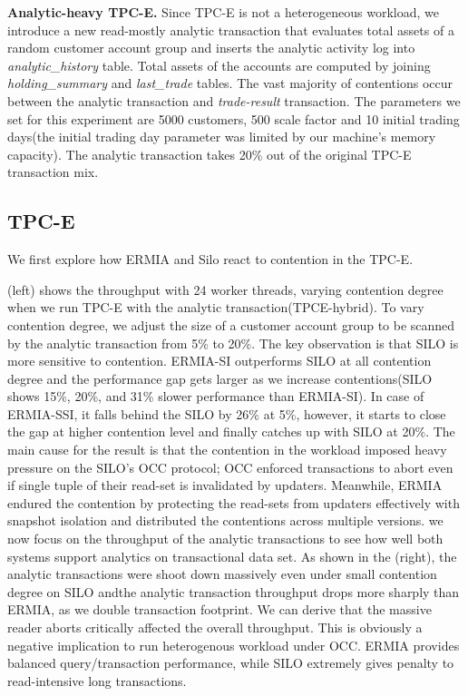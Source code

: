 \textbf{Analytic-heavy TPC-E.}
Since TPC-E is not a heterogeneous workload, we introduce a new read-mostly analytic transaction that evaluates total assets of a random customer account group and inserts the analytic activity log into \textit{analytic\_history} table. Total assets of the accounts are computed by joining \textit{holding\_summary} and \textit{last\_trade} tables. The vast majority of contentions occur between the analytic transaction and \textit{trade-result} transaction.
The parameters we set for this experiment are 5000 customers, 500 scale factor and 10 initial trading days(the initial trading day parameter was limited by our machine's memory capacity).
The analytic transaction takes 20\% out of the original TPC-E transaction mix. %

\subsection{TPC-E}
We first explore how ERMIA and Silo react to contention in the TPC-E.


(left) shows the throughput with 24 worker threads, varying contention degree when we run TPC-E with the analytic transaction(TPCE-hybrid). To vary contention degree, we adjust the size of a customer account group to be scanned by the analytic transaction from 5\% to 20\%. The key observation is that SILO is more sensitive to contention. ERMIA-SI outperforms SILO at all contention degree and the performance gap gets larger as we increase contentions(SILO shows 15\%, 20\%, and 31\% slower performance than ERMIA-SI). In case of ERMIA-SSI, it falls behind the SILO by 26\% at 5\%, however, it starts to close the gap at higher contention level and finally catches up with SILO at 20\%. 
The main cause for the result is that the contention in the workload imposed heavy pressure on the SILO's OCC protocol; OCC enforced transactions to abort even if single tuple of their read-set is invalidated by updaters. Meanwhile, ERMIA endured the contention by protecting the read-sets from updaters effectively with snapshot isolation and distributed the contentions across multiple versions. 
we now focus on the throughput of the analytic transactions to see how well both systems support analytics on transactional data set. As shown in the (right), the analytic transactions were shoot down massively even under small contention degree on SILO andthe analytic transaction throughput drops more sharply than ERMIA, as we double transaction footprint. We can derive that the massive reader aborts critically affected the overall throughput. This is obviously a negative implication to run heterogenous workload under OCC. ERMIA provides balanced query/transaction performance, while SILO extremely gives penalty to read-intensive long transactions. 

